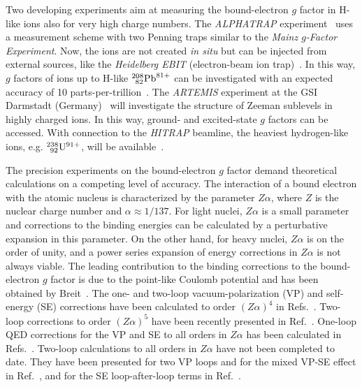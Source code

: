 Two developing experiments aim at measuring the bound-electron $g$ factor in H-like ions also for very high charge numbers. The \textit{ALPHATRAP} experiment~\cite{sturm2017} uses a measurement scheme with two Penning traps similar to the \textit{Mainz $g$-Factor Experiment}. Now, the ions are not created \textit{in situ} but can be injected from external sources, like the \textit{Heidelberg EBIT} (electron-beam ion trap)~\cite{ebit1999}. In this way, $g$ factors of ions up to H-like $^{208}_{\;\,82}\rm{Pb}^{81+}$ can be investigated with an expected accuracy of 10 parts-per-trillion~\cite{sturm2017}. The \textit{ARTEMIS} experiment at the GSI Darmstadt (Germany)~\cite{vogel2013,sturm2017} will investigate the structure of Zeeman sublevels in highly charged ions. In this way, ground- and excited-state $g$ factors can be accessed. With connection to the \textit{HITRAP} beamline, the heaviest hydrogen-like ions, e.g. $^{238}_{\;\,92}\rm{U}^{91+}$, will be available~\cite{vogel2015}.

The precision experiments on the bound-electron $g$ factor demand theoretical calculations on a competing level of accuracy. The interaction of a bound electron with the atomic nucleus is characterized by the parameter $Z\alpha$, where $Z$ is the nuclear charge number and $\alpha \approx 1/137$. For light nuclei, $Z\alpha$ is a small parameter and corrections to the binding energies can be calculated by a perturbative expansion in this parameter. On the other hand, for heavy nuclei, $Z\alpha$ is on the order of unity, and a power series expansion of energy corrections in $Z\alpha$ is not always viable. %
The leading contribution to the binding corrections to the bound-electron $g$ factor is due to the point-like Coulomb potential and has been obtained by Breit~\cite{breit1928}.
The one- and two-loop vacuum-polarization (VP) and self-energy (SE) corrections have been calculated to order $(Z\alpha)^4$ in Refs.~\cite{karshenboim2000,Pachucki2004,pachucki2004_err,Pachucki2005,czarnecki2016}. 
Two-loop corrections to order $(Z\alpha)^5$ have been recently presented in Ref.~\cite{czarnecki2018}.
One-loop QED corrections for the VP and SE to all orders in $Z\alpha$ has been calculated in Refs.~\cite{Beier2000,Karshenboim2001,yerokhin2002,Yerokhin2004,Lee2005,Lee2007,yerokhin2008,yerokhin2010,yerokhin2017}.
Two-loop calculations to all orders in $Z\alpha$ have not been completed to date. They have been presented for two VP loops and for the mixed VP-SE effect in Ref.~\cite{yerokhin2013}, and for the SE loop-after-loop terms in Ref.~\cite{sikora2018_arxiv}.

